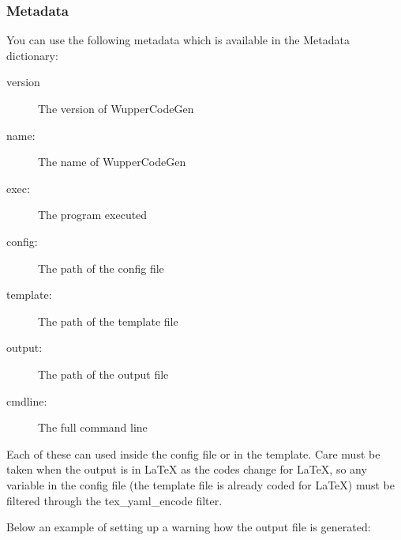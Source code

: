 \documentclass[letterpaper,10pt,english]{sphinxmanual}
\begin{document}
\subsubsection{Metadata}
\label{\detokenize{user:metadata}}
You can use the following metadata which is available in the Metadata dictionary:
\begin{description}
\item[{version}] \leavevmode
The version of WupperCodeGen

\item[{name:}] \leavevmode
The name of WupperCodeGen

\item[{exec:}] \leavevmode
The program executed

\item[{config:}] \leavevmode
The path of the config file

\item[{template:}] \leavevmode
The path of the template file

\item[{output:}] \leavevmode
The path of the output file

\item[{cmdline:}] \leavevmode
The full command line

\end{description}

Each of these can used inside the config file or in the template. Care must be
taken when the output is in LaTeX as the codes change for LaTeX, so any variable
in the config file (the template file is already coded for LaTeX) must be filtered
through the tex\_yaml\_encode filter.

Below an example of setting up a warning how the output file is generated:

\begin{sphinxVerbatim}[commandchars=\\\{\}]
   
   



\end{sphinxVerbatim}
\end{document}
